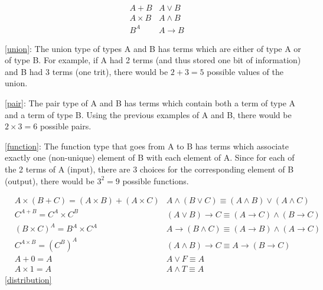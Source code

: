 \documentclass{article}
\begin{document}
\begin{align}
  & A+B & A \lor B \label{union} \\
  & A \times B & A \land B \label{pair} \\
  & B^A & A \rightarrow B \label{function}
\end{align}

\ref{union}:
The union type of types A and B has terms which are either of type A or of type B.
For example, if A had 2 terms (and thus stored one bit of information) and B had 3 terms (one trit),
there would be $2+3=5$ possible values of the union.

\ref{pair}:
The pair type of A and B has terms which contain both a term of type A and a term of type B.
Using the previous examples of A and B, there would be $2 \times 3 = 6$ possible pairs.

\ref{function}:
The function type that goes from A to B has terms which associate exactly one (non-unique) element of B with each element of A.
Since for each of the 2 terms of A (input), there are 3 choices for the corresponding element of B (output),
there would be $3^2=9$ possible functions.

\begin{align}
  & A \times (B+C) = (A \times B)+(A \times C) & A \land (B \lor C) \equiv (A \land B) \lor (A \land C) \label{distribution} \\
  & C^{A+B} = C^A \times C^B & (A \lor B) \rightarrow C \equiv (A \rightarrow C) \land (B \rightarrow C) \label{cases} \\
  & (B \times C)^A = B^A \times C^A & A \rightarrow (B \land C) \equiv (A \rightarrow B) \land (A \rightarrow C) \\
  & C^{A \times B} = (C^B)^A & (A \land B) \rightarrow C \equiv A \rightarrow (B \rightarrow C) \label{currying} \\
  & A+0 = A & A \lor F \equiv A \label{false} \\
  & A \times 1 = A & A \land T \equiv A \label{true}
\end{align}
\ref{distribution}
\end{document}
